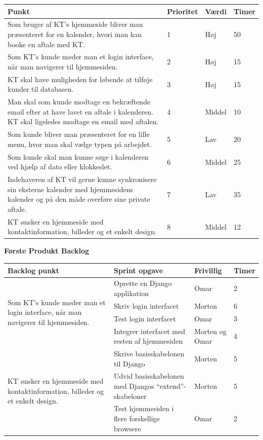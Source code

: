 \documentclass[12pt]{article}   %
\begin{document}
\begin{center}
	\begin{tabular}{|p{8cm}|l|l|l|}
		\hline
Punkt & Prioritet & Værdi & Timer \\ \hline
Som bruger af KT's hjemmeside bliver man præsenteret for en kalender, hvori man
kan booke en aftale med KT. & 1 & Høj &  50 \\ \hline
Som KT's kunde møder man et login interface, når man navigerer til hjemmesiden. & 2 &
Høj & 15  \\ \hline
KT skal have muligheden for løbende at tilføje kunder til databasen. & 3 & Høj
& 15 \\ \hline
Man skal som kunde modtage en bekræftende email efter at have lavet en aftale
i kalenderen. KT skal ligeledes modtage en email med aftalen. & 4 & Middel & 10  \\ \hline
Som kunde bliver man præsenteret for en lille menu, hvor man skal vælge typen
på arbejdet. & 5 & Lav & 20\\ \hline
Som kunde skal man kunne søge i kalenderen ved hjælp af dato eller klokkeslet.
& 6  & Middel &  25 \\ \hline
Indehaveren af KT vil gerne kunne synkronisere sin eksterne kalender med
hjemmesidens kalender og på den måde overføre sine private aftale. & 7 & Lav &
 35 \\ \hline
KT ønsker en hjemmeside med kontaktinformation, billeder og et enkelt design.
& 8 & Middel & 12 \\ \hline
\end{tabular}
\end{center}
\begin{center}\textbf{Første Produkt Backlog}
\end{center}
\vspace{0.5cm}



\begin{center}
	\begin{tabular}{|l|p{4cm}|l|l|}
		\hline
		Backlog punkt & Sprint opgave & Frivillig & Timer\\ \hline
		\multirow{4}{4cm}{Som KT's kunde møder man et login interface,
		når man navigerer til hjemmesiden.} & Oprette en Django
		applikation & Omar  & 2 \\
		& Skriv login interfacet & Morten & 6 \\
		& Test login interfacet & Omar & 3 \\
		& Integrer interfacet med resten af hjemmesiden & Morten og Omar
		& 4 \\ \hline
		\multirow{3}{4cm}{KT ønsker en hjemmeside med
		kontaktinformation, billeder og et enkelt design.} &
		Skrive basisskabelonen til Django & Morten & 5 \\
		& Udvid basisskabelonen med Djangos ``extend''-skabeloner & Morten & 5
		\\ & Test hjemmesiden i flere forskellige browsere & Omar & 2 \\
		\hline

	\end{tabular}
\end{center}
\end{document}
